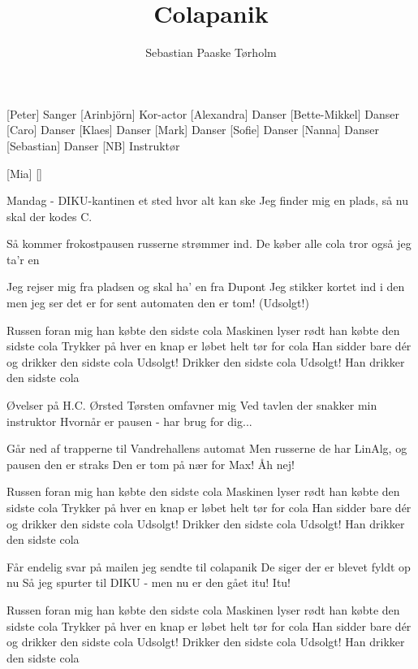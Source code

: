 \documentclass[a4paper,11pt]{article}
\title{Colapanik}
\author{Sebastian Paaske Tørholm}
\begin{document}
\maketitle

\begin{roles}
[Peter] Sanger
[Arinbjörn] Kor-actor 
[Alexandra] Danser
[Bette-Mikkel] Danser
[Caro] Danser
[Klaes] Danser
[Mark] Danser
[Sofie] Danser
[Nanna] Danser
[Sebastian] Danser
[NB] Instruktør
\end{roles}

\begin{props}
[Mia]
[]
\end{props}

\begin{song}

 Mandag - DIKU-kantinen
et sted hvor alt kan ske
Jeg finder mig en plads, så
nu skal der kodes C. 

 Så kommer frokostpausen
russerne strømmer ind.
De køber alle cola
tror også jeg ta’r en

 Jeg rejser mig fra pladsen
og skal ha’ en fra Dupont 
Jeg stikker kortet ind i den
men jeg ser det er for sent
automaten den er tom!
(Udsolgt!)

 Russen foran mig
 han købte den sidste cola 
 Maskinen lyser rødt
 han købte den sidste cola 
 Trykker på hver en knap
 er løbet helt tør for cola 
 Han sidder bare dér
 og drikker den sidste cola
 Udsolgt! 
 Drikker den sidste cola
 Udsolgt!
 Han drikker den sidste cola 

 Øvelser på H.C. Ørsted
Tørsten omfavner mig
Ved tavlen der snakker min instruktor 
Hvornår er pausen - har brug for dig...

 Går ned af trapperne til Vandrehallens automat
Men russerne de har LinAlg, og pausen den er straks
Den er tom på nær for Max!
 Åh nej!

 Russen foran mig
 han købte den sidste cola 
 Maskinen lyser rødt
 han købte den sidste cola 
 Trykker på hver en knap
 er løbet helt tør for cola 
 Han sidder bare dér
 og drikker den sidste cola
 Udsolgt! 
 Drikker den sidste cola
 Udsolgt!
 Han drikker den sidste cola 

 Får endelig svar på mailen jeg sendte til colapanik
De siger der er blevet fyldt op nu
Så jeg spurter til DIKU - men nu er den gået itu!
 Itu!

 Russen foran mig
 han købte den sidste cola 
 Maskinen lyser rødt
 han købte den sidste cola 
 Trykker på hver en knap
 er løbet helt tør for cola 
 Han sidder bare dér
 og drikker den sidste cola
 Udsolgt! 
 Drikker den sidste cola
 Udsolgt!
 Han drikker den sidste cola 

\end{song}
\end{document}
